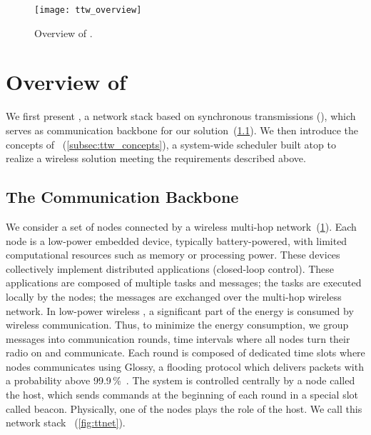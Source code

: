 
\begin{figure}
	\centering
	\texttt{[image: ttw\_overview]}
	\caption{Overview of \TTW.
	}
	\label{fig:ttw_overview}
\end{figure}


\section{Overview of \TTW}
\label{sec:ttw_overview}

We first present \TTnet, a network stack based on synchronous transmissions (\ST), which serves as communication backbone for our solution~(\cref{subsec:ttnet}). We then introduce the concepts of \TTW~(\cref{subsec:ttw_concepts}), a system-wide scheduler built atop \TTnet to realize a wireless \CPS solution meeting the requirements described above.

\subsection{The \TTnet Communication Backbone}
\label{subsec:ttnet}

We consider a set of nodes connected by a wireless multi-hop network~(\cref{fig:ttw_overview}).
Each node is a low-power embedded device, typically battery-powered, with limited computational resources such as memory or processing power.
These devices collectively implement distributed applications (\eg closed-loop control). These applications are composed of multiple tasks and messages; the tasks are executed locally by the nodes; the messages are exchanged over the multi-hop wireless network.
In low-power wireless \CPS, a significant part of the energy is consumed by wireless communication. Thus, to minimize the energy consumption, we group messages into communication rounds, \ie time intervals where all nodes turn their radio on and communicate.
Each round is composed of dedicated time slots where nodes communicates using Glossy, a flooding protocol which delivers packets with a probability above 99.9\,\%~\cite{ferrari2011Glossy}.
The system is controlled centrally by a node called the host, which sends commands at the beginning of each round in a special slot called beacon.
Physically, one of the nodes plays the role of the host.
We call this network stack \TTnet~(\cref{fig:ttnet}).


